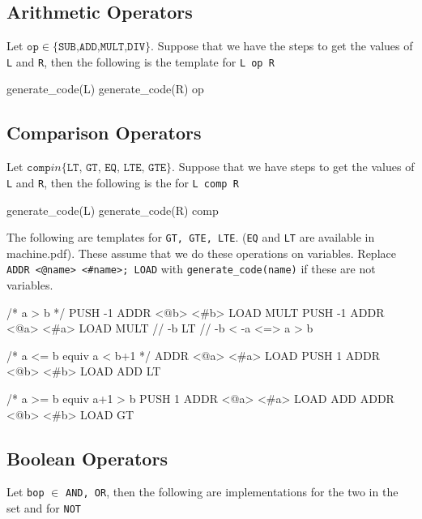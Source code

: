 \subsection{Arithmetic Operators}
Let $\texttt{op} \in \{\texttt{SUB,ADD,MULT,DIV}\}$. Suppose that we have the
steps to get the values of \texttt{L} and \texttt{R}, then the following is the
template for \texttt{L op R}

\begin{code}
generate_code(L)
generate_code(R)
op
\end{code}

\subsection{Comparison Operators}

Let $\texttt{comp} in \{\texttt{LT, GT, EQ, LTE, GTE}\}$. Suppose that we have
steps to get the values of \texttt{L} and \texttt{R}, then the following is the
for \texttt{L comp R}

\begin{code}
generate_code(L)
generate_code(R)
comp
\end{code}


The following are templates for \texttt{GT, GTE, LTE}. (\texttt{EQ} and
\texttt{LT} are available in machine.pdf). These assume that we do these
operations on variables. Replace \texttt{ADDR <@name> <\#name>; LOAD} with 
\texttt{generate\_code(name)} if these are not variables.


\begin{code}[GT]
/* a > b */
PUSH -1
ADDR <@b> <#b>
LOAD
MULT           
PUSH -1
ADDR <@a> <#a>
LOAD
MULT            // -b
LT              // -b < -a <=> a > b
\end{code}

\begin{code}[LTE]
/* a <= b equiv a < b+1 */
ADDR <@a> <#a>
LOAD
PUSH 1
ADDR <@b> <#b>
LOAD
ADD
LT
\end{code}

\begin{code}[GTE]
/* a >= b equiv a+1 > b
PUSH 1
ADDR <@a> <#a>
LOAD
ADD
ADDR <@b> <#b>
LOAD
GT
\end{code}

\subsection{Boolean Operators}
Let \texttt{bop} $\in$ \texttt{AND, OR}, then the following are implementations
for the two in the set and for \texttt{NOT}

